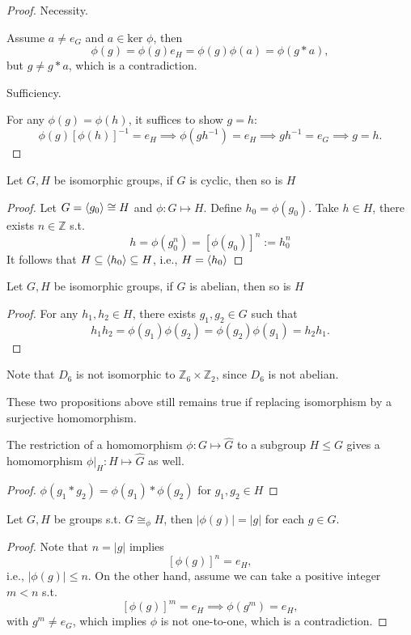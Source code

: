 \begin{proof}
Necessity. 

Assume $a\ne e_G$ and $a\in\mbox{ker }\phi$, then
\[
\phi(g)=\phi(g)e_H=\phi(g)\phi(a)=\phi(g*a),
\]
but $g\ne g*a$, which is a contradiction.

Sufficiency.

For any $\phi(g)=\phi(h)$, it suffices to show $g=h$:
\[
\phi(g)[\phi(h)]^{-1}=e_H\implies
\phi(gh^{-1})=e_H\implies
gh^{-1}=e_G\implies g=h.
\]
\end{proof}
\begin{proposition}
Let $G,H$ be isomorphic groups, if $G$ is cyclic, then so is $H$
\end{proposition}
\begin{proof}
Let $G=\langle g_0\rangle\cong H$ and $\phi:G\mapsto H$. Define $h_0=\phi(g_0)$. Take $h\in H$, there exists $n\in\mathbb{Z}$ s.t.
\[
h=\phi(g_0^n)=[\phi(g_0)]^n:=h_0^n
\]
It follows that $H\subseteq\langle h_0\rangle\subseteq H$, i.e., $H=\langle h_0\rangle$
\end{proof}
\begin{proposition}
Let $G,H$ be isomorphic groups, if $G$ is abelian, then so is $H$
\end{proposition}
\begin{proof}
For any $h_1,h_2\in H$, there exists $g_1,g_2\in G$ such that
\[
h_1h_2=\phi(g_1)\phi(g_2)=\phi(g_2)\phi(g_1)=h_2h_1.
\]
\end{proof}
Note that $D_6$ is not isomorphic to $\mathbb{Z}_6\times\mathbb{Z}_2$, since $D_6$ is not abelian.
\begin{remark}
These two propositions above still remains true if replacing isomorphism by a surjective homomorphism.
\end{remark}
\begin{proposition}
The restriction of a homomorphism $\phi:G\mapsto\hat G$ to a subgroup $H\le G$ gives a homomorphism $\phi|_H:H\mapsto\hat G$ as well.
\end{proposition}
\begin{proof}
$\phi(g_1*g_2)=\phi(g_1)*\phi(g_2)$ for $g_1,g_2\in H$
\end{proof}
\begin{proposition}
Let $G,H$ be groups s.t. $G\cong_{\phi} H$, then $|\phi(g)| = |g|$ for each $g\in G$.
\end{proposition}
\begin{proof}
Note that $n=|g|$ implies
\[
[\phi(g)]^n=e_H,
\]
i.e., $|\phi(g)|\le n$. On the other hand, assume we can take a positive integer $m<n$ s.t.
\[
[\phi(g)]^m=e_H\implies \phi(g^m)=e_H,
\]
with $g^m\ne e_G$, which implies $\phi$ is not one-to-one, which is a contradiction.
\end{proof}

